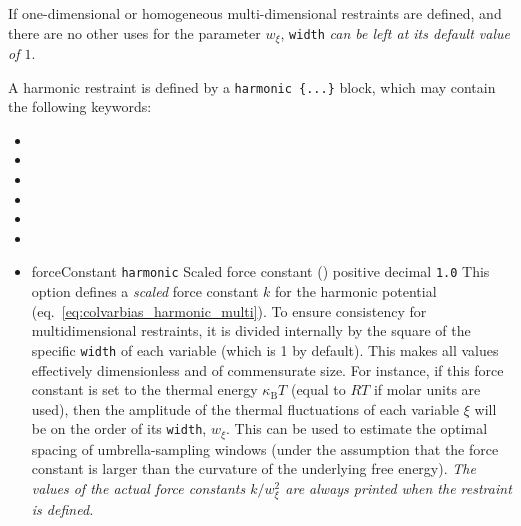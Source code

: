 If one-dimensional or homogeneous multi-dimensional restraints are defined, and there are no other uses for the parameter $w_{\xi}$, \texttt{width} \emph{can be left at its default value of $1$}.

A harmonic restraint is defined by a \texttt{harmonic~\{...\}} block, which may contain the following keywords:
\begin{itemize}

\item {}
\item {}
\item {}
\item {}
\item {}
\item {}

\item %
  \keydef
    {forceConstant}{%
    \texttt{harmonic}}{%
    Scaled force constant ()}{%
    positive decimal}{%
    \texttt{1.0}}{%
    This option defines a \emph{scaled} force constant $k$ for the harmonic potential (eq.~\ref{eq:colvarbias_harmonic_multi}).
    To ensure consistency for multidimensional restraints, it is divided internally by the square of the specific \texttt{width} of each variable (which is 1 by default).
    This makes all values effectively dimensionless and of commensurate size.
    For instance, if this force constant is set to the thermal energy $\kappa_{\mathrm{B}}T$ (equal to $RT$ if molar units are used), then the amplitude of the thermal fluctuations of each variable $\xi$ will be on the order of its \texttt{width}, $w_{\xi}$.
    This can be used to estimate the optimal spacing of umbrella-sampling windows (under the assumption that the force constant is larger than the curvature of the underlying free energy).
    \emph{The values of the actual force constants $k/w_{\xi}^2$ are always printed when the restraint is defined.}
  }


\end{itemize}
